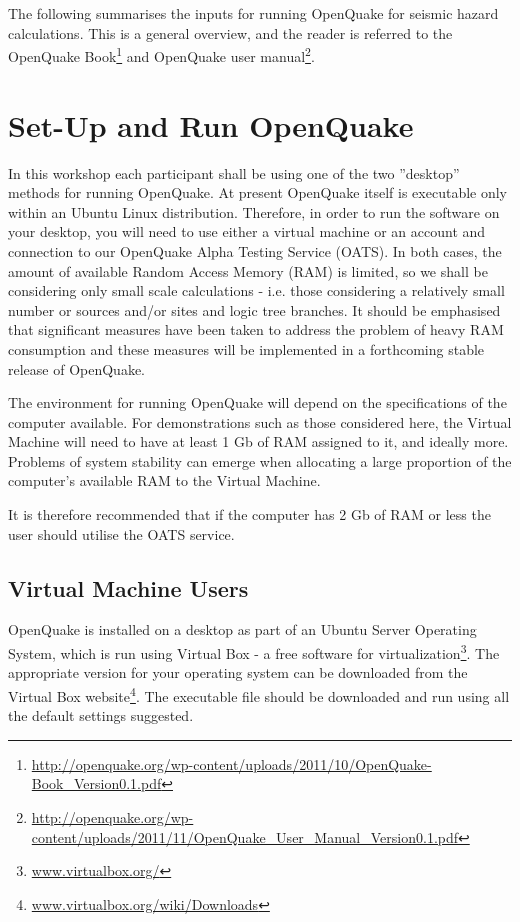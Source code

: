 The following summarises the inputs for running OpenQuake for seismic 
hazard calculations. This is a general overview, and the reader is 
referred to the OpenQuake Book\footnote{\href{http://openquake.org/wp-content/uploads/2011/10/OpenQuake-Book\_Version0.1.pdf}{http://openquake.org/wp-content/uploads/2011/10/OpenQuake-Book\_Version0.1.pdf}} 
and OpenQuake user manual\footnote{\href{http://openquake.org/wp-content/uploads/2011/11/OpenQuake\_User\_Manual\_Version0.1.pdf}{http://openquake.org/wp-content/uploads/2011/11/OpenQuake\_User\_Manual\_Version0.1.pdf}}. 
\section{Set-Up and Run OpenQuake}
In this workshop each participant shall be using one of the two ''desktop'' 
methods for running OpenQuake. At present OpenQuake itself is executable 
only within an Ubuntu Linux distribution. 
Therefore, in order to run the software on your desktop, you will need to 
use either a virtual machine or an account and connection to our OpenQuake 
Alpha Testing Service (OATS). In both cases, the amount of available Random 
Access Memory (RAM) is limited, so we shall be considering only small scale 
calculations - i.e. those considering a relatively small number or sources 
and/or sites and logic tree branches. It should be emphasised that 
significant measures have been taken to address the problem of heavy RAM 
consumption and these measures will be implemented in a forthcoming stable 
release of OpenQuake.  

The environment for running OpenQuake will depend on the specifications of 
the computer available. For demonstrations such as those considered here, 
the Virtual Machine will need to have at least 1 Gb of RAM assigned to it, 
and ideally more. Problems of system stability can emerge when allocating 
a large proportion of the computer's available RAM to the Virtual Machine. 

It is therefore recommended that if the computer has 2 Gb of RAM or less the 
user should utilise the OATS service. 
%
\subsection{Virtual Machine Users}
OpenQuake is installed on a desktop as part of an Ubuntu Server Operating 
System, which is run using Virtual Box - a free software for 
virtualization\footnote{\href{https://www.virtualbox.org}{www.virtualbox.org/}}. 
The appropriate version for your operating system can be downloaded from
the Virtual Box website\footnote{\href{https://www.virtualbox.org/wiki/Downloads}{www.virtualbox.org/wiki/Downloads}}. 
The executable file should be downloaded and run using all the default 
settings suggested.

